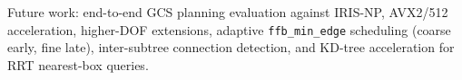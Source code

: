 \documentclass[journal]{IEEEtran}
\begin{document}
Future work: end-to-end GCS planning evaluation against IRIS-NP,
AVX2/512 acceleration, higher-DOF extensions,
adaptive \texttt{ffb\_min\_edge} scheduling
(coarse early, fine late), inter-subtree connection detection,
and KD-tree acceleration for RRT nearest-box queries.



\end{document}
